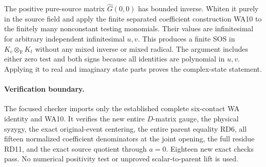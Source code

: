 The positive pure-source matrix $\widehat G(0,0)$ has bounded inverse.
Whiten it purely in the source field and apply the finite separated
coefficient construction WA10 to the finitely many nonconstant
testing monomials. Their values are infinitesimal for arbitrary
independent infinitesimal $u,v$. This produces a finite SOS in
$K_c\otimes_{\mathbb R}K_t$ without any mixed inverse or mixed radical.
The argument includes either zero test and both signs because all
identities are polynomial in $u,v$. Applying it to real and imaginary
state parts proves the complex-state statement.

\paragraph{Verification boundary.}
The focused checker imports only the established complete six-contact
WA identity and WA10. It verifies the new entire $D$-matrix gauge,
the physical syzygy, the exact original-event centering, the entire
parent equality RD6, all fifteen normalized coefficient denominators
at the joint opening, the full residue RD11, and the exact source
quotient through $a=0$. Eighteen new exact checks pass. No numerical
positivity test or unproved scalar-to-parent lift is used.
